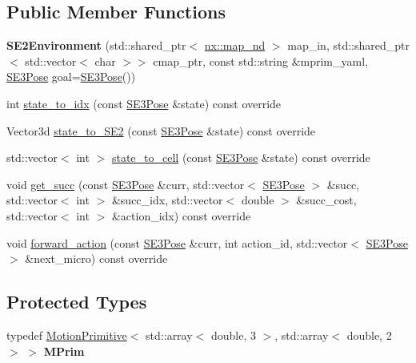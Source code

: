 \subsection*{Public Member Functions}
\begin{DoxyCompactItemize}
\item 
\mbox{\label{classnx_1_1SE2Environment_acbb1475684cbec971710e61cdbcadc6e}} 
{\bfseries S\+E2\+Environment} (std\+::shared\+\_\+ptr$<$ \hyperlink{classnx_1_1map__nd}{nx\+::map\+\_\+nd} $>$ map\+\_\+in, std\+::shared\+\_\+ptr$<$ std\+::vector$<$ char $>$$>$ cmap\+\_\+ptr, const std\+::string \&mprim\+\_\+yaml, \hyperlink{structnx_1_1SE3Pose}{S\+E3\+Pose} goal=\hyperlink{structnx_1_1SE3Pose}{S\+E3\+Pose}())
\item 
int \hyperlink{classnx_1_1SE2Environment_a0fe7c5f438795a98f17be0ed95b2ff7c}{state\+\_\+to\+\_\+idx} (const \hyperlink{structnx_1_1SE3Pose}{S\+E3\+Pose} \&state) const override
\item 
Vector3d \hyperlink{classnx_1_1SE2Environment_ab1f9056e6fffe905ec225ee3885679b4}{state\+\_\+to\+\_\+\+S\+E2} (const \hyperlink{structnx_1_1SE3Pose}{S\+E3\+Pose} \&state) const override
\item 
std\+::vector$<$ int $>$ \hyperlink{classnx_1_1SE2Environment_ae3ac780e46d421898e3c7db696d8026f}{state\+\_\+to\+\_\+cell} (const \hyperlink{structnx_1_1SE3Pose}{S\+E3\+Pose} \&state) const override
\item 
void \hyperlink{classnx_1_1SE2Environment_a2a4159dc6bf024e522bb504c77e9aa69}{get\+\_\+succ} (const \hyperlink{structnx_1_1SE3Pose}{S\+E3\+Pose} \&curr, std\+::vector$<$ \hyperlink{structnx_1_1SE3Pose}{S\+E3\+Pose} $>$ \&succ, std\+::vector$<$ int $>$ \&succ\+\_\+idx, std\+::vector$<$ double $>$ \&succ\+\_\+cost, std\+::vector$<$ int $>$ \&action\+\_\+idx) const override
\item 
void \hyperlink{classnx_1_1SE2Environment_ac9453c2a57e53c9f511eb04aabaa0809}{forward\+\_\+action} (const \hyperlink{structnx_1_1SE3Pose}{S\+E3\+Pose} \&curr, int action\+\_\+id, std\+::vector$<$ \hyperlink{structnx_1_1SE3Pose}{S\+E3\+Pose} $>$ \&next\+\_\+micro) const override
\end{DoxyCompactItemize}
\subsection*{Protected Types}
\begin{DoxyCompactItemize}
\item 
\mbox{\label{classnx_1_1SE2Environment_a086b171b619278b4fde9819cfb433b48}} 
typedef \hyperlink{structnx_1_1MotionPrimitive}{Motion\+Primitive}$<$ std\+::array$<$ double, 3 $>$, std\+::array$<$ double, 2 $>$ $>$ {\bfseries M\+Prim}
\end{DoxyCompactItemize}
